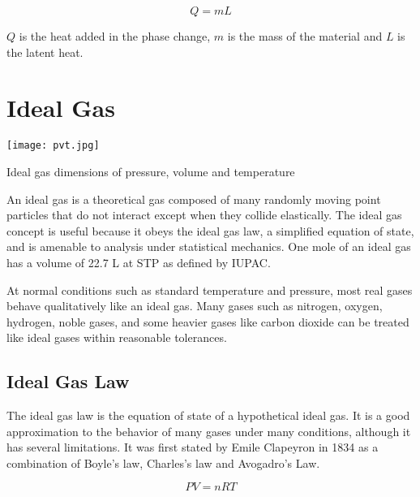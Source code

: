 $$Q=mL$$

$Q$ is the heat added in the phase change, $m$ is the mass of the material and $L$ is the latent heat.



\section {Ideal Gas}
\begin{marginfigure}[50pt]
  \texttt{[image: pvt.jpg]}
  \caption{Ideal gas dimensions of pressure, volume and temperature}
  \label{fig:marginfig}
\end{marginfigure}



An ideal gas is a theoretical gas composed of many randomly moving point particles that do not interact except when they collide elastically. The ideal gas concept is useful because it obeys the ideal gas law, a simplified equation of state, and is amenable to analysis under statistical mechanics. One mole of an ideal gas has a volume of 22.7 L at STP as defined by IUPAC.

At normal conditions such as standard temperature and pressure, most real gases behave qualitatively like an ideal gas. Many gases such as nitrogen, oxygen, hydrogen, noble gases, and some heavier gases like carbon dioxide can be treated like ideal gases within reasonable tolerances.

\subsection{Ideal Gas Law}
The ideal gas law is the equation of state of a hypothetical ideal gas. It is a good approximation to the behavior of many gases under many conditions, although it has several limitations. It was first stated by Emile Clapeyron in 1834 as a combination of Boyle's law, Charles's law and Avogadro's Law.

$$PV=nRT$$

